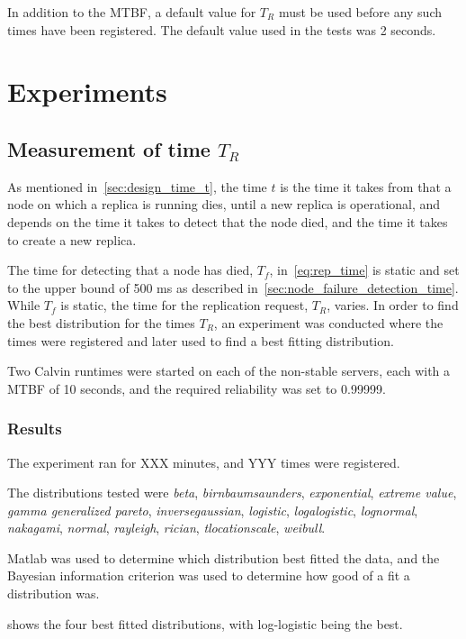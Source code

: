 \documentclass{cslthse-msc}
\begin{document}
In addition to the MTBF, a default value for $T_R$ must be used before any such times have been registered. The default value used in the tests was 2 seconds.

\section{Experiments}

\subsection{Measurement of time $T_R$} \label{sec:eval_time_t}
As mentioned in~\cref{sec:design_time_t}, the time $t$ is the time it takes from that a node on which a replica is running dies, until a new replica is operational, and depends on the time it takes to detect that the node died, and the time it takes to create a new replica. 

The time for detecting that a node has died, $T_f$, in~\cref{eq:rep_time} is static and set to the upper bound of 500 ms as described in~\cref{sec:node_failure_detection_time}. While $T_f$ is static, the time for the replication request, $T_R$, varies. In order to find the best distribution for the times $T_R$, an experiment was conducted where the times were registered and later used to find a best fitting distribution.

Two Calvin runtimes were started on each of the non-stable servers, each with a MTBF of 10 seconds, and the required reliability was set to 0.99999.

\subsubsection*{Results}
The experiment ran for XXX minutes, and YYY times were registered.

The distributions tested were \emph{beta}, \emph{birnbaumsaunders}, \emph{exponential}, \emph{extreme value}, \emph{gamma generalized pareto}, \emph{inversegaussian}, \emph{logistic}, \emph{logalogistic}, \emph{lognormal}, \emph{nakagami}, \emph{normal}, \emph{rayleigh}, \emph{rician}, \emph{tlocationscale}, \emph{weibull}.

Matlab was used to determine which distribution best fitted the data, and the Bayesian information criterion was used to determine how good of a fit a distribution was.

 shows the four best fitted distributions, with log-logistic being the best.
\end{document}
